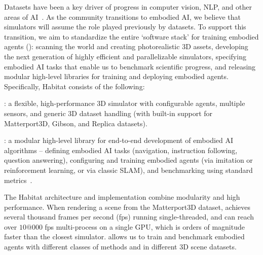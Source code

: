 Datasets have been a key driver of progress in computer vision, NLP, and other areas of AI~\cite{Deng09imagenet,mscoco,antol_iccv15,ammirato2017dataset}.
As the community transitions to embodied AI, we believe that simulators will 
assume the role played previously by datasets. 
To support this transition, 
we aim to standardize the entire `software stack' for training embodied agents 
(): 
scanning the world and creating photorealistic 3D assets, 
developing the next generation of highly efficient and parallelizable simulators, 
specifying embodied AI tasks that enable us to benchmark scientific progress, 
and releasing modular high-level libraries for training and deploying embodied agents. 
%
Specifically, Habitat consists of the following: 
\begin{asparaenum}

\item \habitatsim: 
a flexible, high-performance 3D simulator with configurable agents, 
multiple sensors, and generic 3D dataset handling
(with built-in support for Matterport3D, Gibson, and Replica datasets). 

\item \habitatapi: a modular high-level library for 
end-to-end development of embodied AI algorithms -- 
defining embodied AI tasks (\eg navigation,
instruction following, question answering), 
configuring %
and training embodied agents (via imitation or reinforcement learning, 
or via classic SLAM), and 
benchmarking 
using standard metrics~\cite{Anderson2018-Evaluation}.

\end{asparaenum}


The Habitat architecture and implementation combine modularity and high performance.
When rendering a scene from the Matterport3D dataset, \habitatsim achieves several thousand frames per second (fps) running single-threaded, and can reach over $10@000$ fps multi-process on a single GPU, which is orders of magnitude faster than the closest simulator. 
\habitatapi allows us to train and benchmark embodied agents with different classes of methods and in different 3D scene datasets. 

